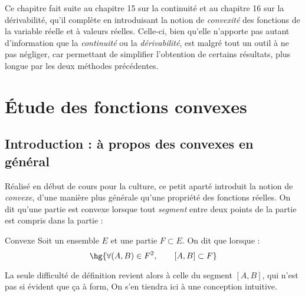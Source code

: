 \documentclass[a4paper,french,bookmarks]{article}
\begin{document}

Ce chapitre fait suite au chapitre 15 sur la continuité et au chapitre
16 sur la dérivabilité, qu'il complète en introduisant la notion de
\textit{convexité} des fonctions de la variable réelle et à valeurs
réelles. Celle-ci, bien qu'elle n'apporte pas autant d'information que
la \textit{continuité} ou la \textit{dérivabilité}, est malgré tout un
outil à ne pas négliger, car permettant de simplifier l'obtention de
certains résultats, plus longue par les deux méthodes précédentes.

\initcours{}

\section{Étude des fonctions convexes}

\subsection{Introduction : à propos des convexes en général}

Réalisé en début de cours pour la culture, ce petit aparté introduit
la notion de \textit{convexe}, d'une manière plus générale qu'une
propriété des fonctions réelles. On dit qu'une partie est convexe
lorsque tout \textit{segment} entre deux points de la partie est
compris dans la partie :

\begin{definition}{Convexe}{}
    Soit un ensemble $E$ et une partie $F \subset E$. On dit que
     lorsque :
    \[ \hg{\forall (A, B) \in F^2,\qquad [A, B] \subset F}\]
\end{definition}

La seule difficulté de définition revient alors à celle du segment
$[A, B]$, qui n'est pas si évident que ça à form, On s'en tiendra ici
à une conception intuitive.
\end{document}
